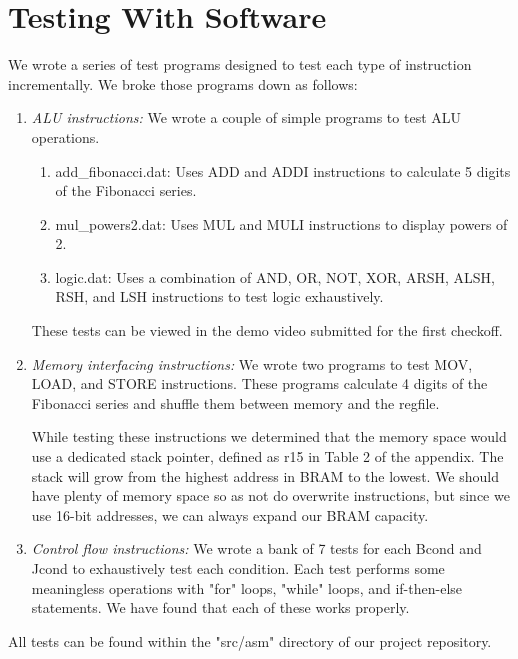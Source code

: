 \documentclass[conference]{IEEEtran}
\begin{document}
\section{Testing With Software}
We wrote a series of test programs designed to test each type of instruction incrementally. We broke those programs down as follows:
\begin{enumerate}
    \item \textit{ALU instructions:} We wrote a couple of simple programs to test ALU operations.
    \begin{enumerate}
        \item add\_fibonacci.dat: Uses ADD and ADDI instructions to calculate 5 digits of the Fibonacci series.
        \item mul\_powers2.dat: Uses MUL and MULI instructions to display powers of 2.
        \item logic.dat: Uses a combination of AND, OR, NOT, XOR, ARSH, ALSH, RSH, and LSH instructions to test logic exhaustively.
    \end{enumerate}
    These tests can be viewed in the demo video submitted for the first checkoff.
    \item \textit{Memory interfacing instructions:} We wrote two programs to test MOV, LOAD, and STORE instructions. These programs calculate 4 digits of the Fibonacci series and shuffle them between memory and the regfile.
    
    While testing these instructions we determined that the memory space would use a dedicated stack pointer, defined as r15 in Table 2 of the appendix. The stack will grow from the highest address in BRAM to the lowest. We should have plenty of memory space so as not do overwrite instructions, but since we use 16-bit addresses, we can always expand our BRAM capacity.
    \item \textit{Control flow instructions:} We wrote a bank of 7 tests for each Bcond and Jcond to exhaustively test each condition. Each test performs some meaningless operations with "for" loops, "while" loops, and if-then-else statements. We have found that each of these works properly.
\end{enumerate}
All tests can be found within the "src/asm" directory of our project repository.
\end{document}
